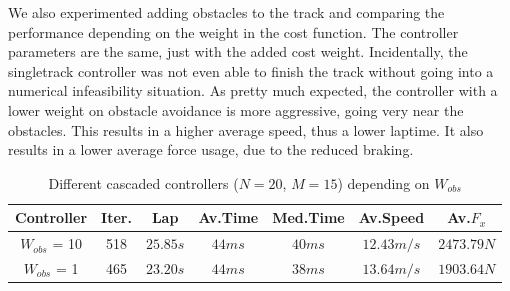 \documentclass[a4paper, onecolumn, 12pt]{article}
\begin{document}
We also experimented adding obstacles to the track and comparing the performance
depending on the weight in the cost function. The controller parameters are the
same, just with the added cost weight. Incidentally, the singletrack controller
was not even able to finish the track without going into a numerical
infeasibility situation. As pretty much expected, the controller with a lower weight on obstacle
avoidance is more aggressive, going very near the obstacles. This results in a
higher average speed, thus a lower laptime. It also results in a lower average
force usage, due to the reduced braking.
\begin{table}[H] 
    \centering
    \caption{Different cascaded controllers ($N=20$, $M=15$) depending on $W_{obs}$} \label{obstacles_ippodromo}
    \begin{tabular}{|c||c|c|c|c|c|c|}
        \hline
        \textbf{Controller} & \textbf{Iter.} & \textbf{Lap} & \textbf{Av.Time} & \textbf{Med.Time} & \textbf{Av.Speed} & \textbf{Av.$F_x$} \\ [0.5ex] 
        \hline
        \hline
        $W_{obs}$ = 10 & 518 & $25.85 s$ & $44 ms$ & $40 ms$ & $12.43 m/s$ & $2473.79 N$\\
        \hline
        $W_{obs}$ = 1 & 465 & $23.20 s$ & $44 ms$ & $38 ms$ & $13.64 m/s$ & $1903.64 N$\\
        \hline
    \end{tabular}
\end{table}
\end{document}
